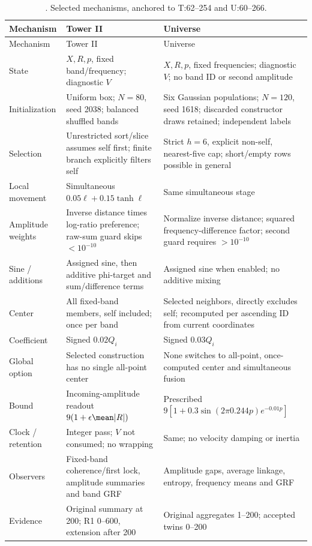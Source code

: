 \begin{longtable}{P{25mm}P{60mm}P{62mm}}
\caption{. Selected mechanisms, anchored to T:62--254 and U:60--266.}\label{tab:compare}\\
\toprule Mechanism & Tower II & Universe\\\midrule
\endfirsthead\toprule Mechanism & Tower II & Universe\\\midrule\endhead
State & \(X,R,p\), fixed band/frequency; diagnostic \(V\) & \(X,R,p\), fixed frequencies; diagnostic \(V\); no band ID or second amplitude\\
Initialization & Uniform box; \(N=80\), seed 2038; balanced shuffled bands & Six Gaussian populations; \(N=120\), seed 1618; discarded constructor draws retained; independent labels\\
Selection & Unrestricted sort/slice assumes self first; finite branch explicitly filters self & Strict \(h=6\), explicit non-self, nearest-five cap; short/empty rows possible in general\\
Local movement & Simultaneous \(0.05\ell+0.15\tanh\ell\) & Same simultaneous stage\\
Amplitude weights & Inverse distance times log-ratio preference; raw-sum guard skips \(<10^{-10}\) & Normalize inverse distance; squared frequency-difference factor; second guard requires \(>10^{-10}\)\\
Sine / additions & Assigned sine, then additive phi-target and sum/difference terms & Assigned sine when enabled; no additive mixing\\
Center & All fixed-band members, self included; once per band & Selected neighbors, directly excludes self; recomputed per ascending ID from current coordinates\\
Coefficient & Signed \(0.02Q_i\) & Signed \(0.03Q_i\)\\
Global option & Selected construction has no single all-point center & None switches to all-point, once-computed center and simultaneous fusion\\
Bound & Incoming-amplitude readout \(9(1+\epsilon\mean|R|)\) & Prescribed \(9[1+0.3\sin(2\pi0.244p)e^{-0.01p}]\)\\
Clock / retention & Integer pass; \(V\) not consumed; no wrapping & Same; no velocity damping or inertia\\
Observers & Fixed-band coherence/first lock, amplitude summaries and band GRF & Amplitude gaps, average linkage, entropy, frequency means and GRF\\
Evidence & Original summary at 200; R1 0--600, extension after 200 & Original aggregates 1--200; accepted twins 0--200\\
\bottomrule
\end{longtable}


